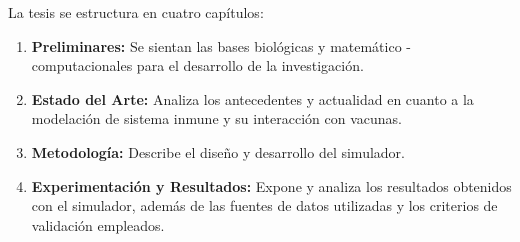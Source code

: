 La tesis se estructura en cuatro capítulos:
\begin{enumerate}
    \item \textbf{Preliminares:} Se sientan las bases biológicas y matemático - computacionales para el desarrollo de la investigación.
    \item \textbf{Estado del Arte:} Analiza los antecedentes y actualidad en cuanto a la modelación de sistema inmune y su interacción con vacunas.
    
    \item \textbf{Metodología:} Describe el diseño y desarrollo del simulador.
    \item \textbf{Experimentación y Resultados:} Expone y analiza los resultados obtenidos con el simulador, además de las fuentes de datos utilizadas y los criterios de validación empleados.
\end{enumerate}